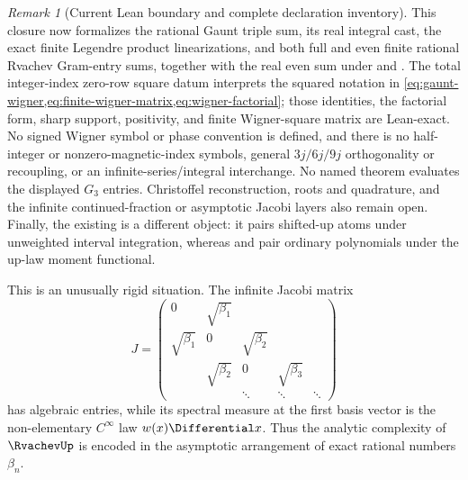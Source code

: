 \documentclass[11pt,oneside]{article}
\theoremstyle{definition}
\theoremstyle{remark}
\newtheorem{remark}[theorem]{Remark}
\numberwithin{equation}{section}
\begin{document}
\begin{remark}[Current Lean boundary and complete declaration inventory]
This closure now formalizes the rational Gaunt triple sum, its real integral cast,
the exact finite Legendre product linearizations, and both full and even finite rational
Rvachev Gram-entry sums, together with the real even sum under
 and .  The total integer-index zero-row square
datum interprets the squared notation in
\cref{eq:gaunt-wigner,eq:finite-wigner-matrix,eq:wigner-factorial}; those identities,
the factorial form, sharp support, positivity, and finite Wigner-square matrix are
Lean-exact.  No signed Wigner symbol or phase convention is defined, and there is no
half-integer or nonzero-magnetic-index symbols, general \(3j/6j/9j\)
orthogonality or recoupling, or an infinite-series/integral interchange.  No
named theorem evaluates the displayed
\(G_3\) entries.  Christoffel reconstruction, roots and quadrature, and the infinite
continued-fraction or asymptotic Jacobi layers also remain open.
Finally, the existing  is a different object: it pairs
shifted-up atoms under unweighted interval integration, whereas
 and  pair ordinary
polynomials under the up-law moment functional.
\end{remark}

This is an unusually rigid situation.  The infinite Jacobi matrix
\begin{equation}
 J=\begin{pmatrix}
 0&\sqrt{\beta_1}&&&\\
 \sqrt{\beta_1}&0&\sqrt{\beta_2}&&\\
 &\sqrt{\beta_2}&0&\sqrt{\beta_3}&\\
 &&\ddots&\ddots&\ddots
 \end{pmatrix}
 \label{eq:jacobi-matrix}
\end{equation}
has algebraic entries, while its spectral measure at the first basis vector
is the non-elementary $C^\infty$ law $w(x)\Differential x$.  Thus the analytic
complexity of $\RvachevUp$ is encoded in the asymptotic arrangement of exact rational
numbers $\beta_n$.
\end{document}
